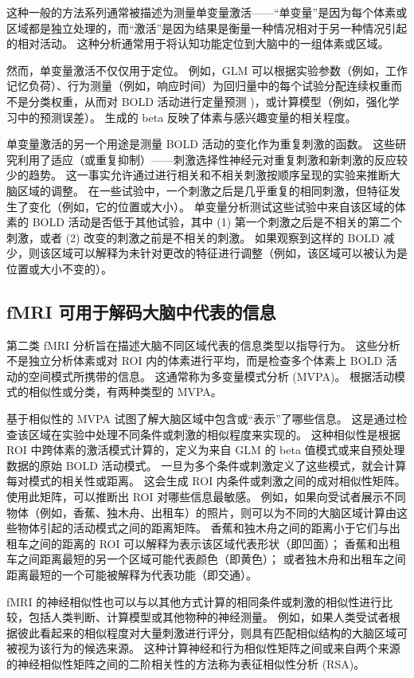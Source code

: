 这种一般的方法系列通常被描述为测量单变量激活——“单变量”是因为每个体素或区域都是独立处理的，而“激活”是因为结果是衡量一种情况相对于另一种情况引起的相对活动。 
这种分析通常用于将认知功能定位到大脑中的一组体素或区域。


然而，单变量激活不仅仅用于定位。 
例如，GLM 可以根据实验参数（例如，工作记忆负荷）、行为测量（例如，响应时间）为回归量中的每个试验分配连续权重而不是分类权重，从而对 BOLD 活动进行定量预测 )，或计算模型（例如，强化学习中的预测误差）。 
生成的 beta 反映了体素与感兴趣变量的相关程度。


单变量激活的另一个用途是测量 BOLD 活动的变化作为重复刺激的函数。 
这些研究利用了适应（或重复抑制）——刺激选择性神经元对重复刺激和新刺激的反应较少的趋势。 
这一事实允许通过进行相关和不相关刺激按顺序呈现的实验来推断大脑区域的调整。
在一些试验中，一个刺激之后是几乎重复的相同刺激，但特征发生了变化（例如，它的位置或大小）。 
单变量分析测试这些试验中来自该区域的体素的 BOLD 活动是否低于其他试验，其中 (1) 第一个刺激之后是不相关的第二个刺激，或者 (2) 改变的刺激之前是不相关的刺激。
如果观察到这样的 BOLD 减少，则该区域可以解释为未针对更改的特征进行调整（例如，该区域可以被认为是位置或大小不变的）。


\subsection{fMRI 可用于解码大脑中代表的信息}
第二类 fMRI 分析旨在描述大脑不同区域代表的信息类型以指导行为。 
这些分析不是独立分析体素或对 ROI 内的体素进行平均，而是检查多个体素上 BOLD 活动的空间模式所携带的信息。 
这通常称为多变量模式分析 (MVPA)。 
根据活动模式的相似性或分类，有两种类型的 MVPA。


基于相似性的 MVPA 试图了解大脑区域中包含或“表示”了哪些信息。 
这是通过检查该区域在实验中处理不同条件或刺激的相似程度来实现的。 
这种相似性是根据 ROI 中跨体素的激活模式计算的，定义为来自 GLM 的 beta 值模式或来自预处理数据的原始 BOLD 活动模式。 
一旦为多个条件或刺激定义了这些模式，就会计算每对模式的相关性或距离。 
这会生成 ROI 内条件或刺激之间的成对相似性矩阵。 
使用此矩阵，可以推断出 ROI 对哪些信息最敏感。 
例如，如果向受试者展示不同物体（例如，香蕉、独木舟、出租车）的照片，则可以为不同的大脑区域计算由这些物体引起的活动模式之间的距离矩阵。 
香蕉和独木舟之间的距离小于它们与出租车之间的距离的 ROI 可以解释为表示该区域代表形状（即凹面）； 
香蕉和出租车之间距离最短的另一个区域可能代表颜色（即黄色）； 
或者独木舟和出租车之间距离最短的一个可能被解释为代表功能（即交通）。


fMRI 的神经相似性也可以与以其他方式计算的相同条件或刺激的相似性进行比较，包括人类判断、计算模型或其他物种的神经测量。 
例如，如果人类受试者根据彼此看起来的相似程度对大量刺激进行评分，则具有匹配相似结构的大脑区域可被视为该行为的候选来源。 
这种计算神经和行为相似性矩阵之间或来自两个来源的神经相似性矩阵之间的二阶相关性的方法称为表征相似性分析 (RSA)。


